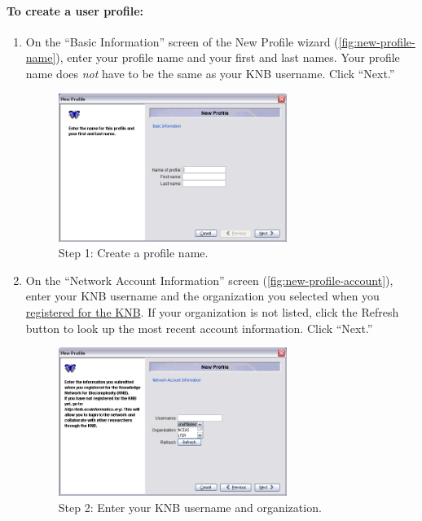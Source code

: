 \paragraph{To create a user profile:}
\begin{enumerate}
  \item On the ``Basic Information'' screen of the New Profile wizard
    (\autoref{fig:new-profile-name}), enter your profile name and your
    first and last names. Your profile name does \emph{not} have to be
    the same as your KNB username. Click ``Next.''

  \begin{figure}
    \centering
      \includegraphics[width=0.7\textwidth]{images/new-profile-name.png}
    \caption{Step 1: Create a profile name.}
    \label{fig:new-profile-name}
  \end{figure}

  \item On the ``Network Account Information'' screen
    (\autoref{fig:new-profile-account}), enter your KNB username and the
    organization you selected when you
    \hyperref[sec:register]{registered for the KNB}. If your
    organization is not listed, click the Refresh button to look up the
    most recent account information. Click ``Next.'' 

  \begin{figure}
    \centering
      \includegraphics[width=0.7\textwidth]{images/new-profile-account.png}
    \caption{Step 2: Enter your KNB username and organization.}
    \label{fig:new-profile-account}
  \end{figure}


\end{enumerate}
